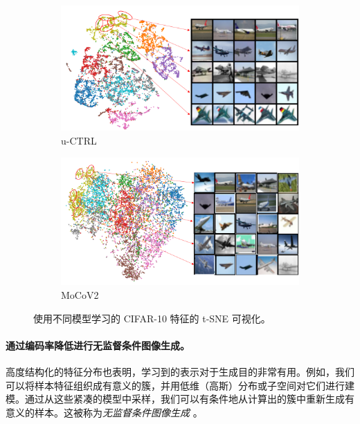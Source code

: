 \documentclass[../../book-main.tex]{subfiles}
\begin{document}
\begin{figure}[h!]
    \begin{subfigure}[t]{0.46\textwidth}
        \centering
        \includegraphics[width=\textwidth]{figs_chap6/uCTRL-tsne2.png}
        \caption{u-CTRL}
    \end{subfigure}
    \hfill
    \begin{subfigure}[t]{0.46\textwidth}
        \centering
        \includegraphics[width=\textwidth]{figs_chap6/MoCoV2-tsne3.png}
        \caption{MoCoV2}
    \end{subfigure}
    \caption{\small 使用不同模型学习的 CIFAR-10 特征的 t-SNE 可视化。} 
    \label{fig:tsne}
\end{figure}

\paragraph{通过编码率降低进行无监督条件图像生成。}
高度结构化的特征分布也表明，学习到的表示对于生成目的非常有用。例如，我们可以将样本特征组织成有意义的簇，并用低维（高斯）分布或子空间对它们进行建模。通过从这些紧凑的模型中采样，我们可以有条件地从计算出的簇中重新生成有意义的样本。这被称为{\em 无监督条件图像生成} \cite{hwang2021stein}。
\end{document}
